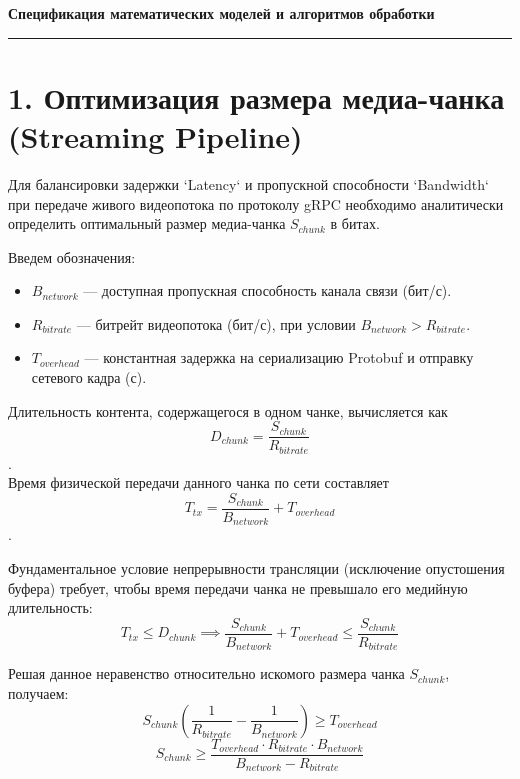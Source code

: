 \documentclass[12pt,a4paper]{article}
\begin{document}
\thispagestyle{fancy}

\begin{center}
    \vspace{0.4cm}
    \Large{\textbf{Спецификация математических моделей и алгоритмов обработки}}\\
        \vspace{0.5cm}
    \rule{\textwidth}{0.4pt}
\end{center}

\vspace{1cm}

\section{1. Оптимизация размера медиа-чанка (Streaming Pipeline)}

Для балансировки задержки `Latency` и пропускной способности `Bandwidth` при передаче живого видеопотока по протоколу gRPC необходимо аналитически определить оптимальный размер медиа-чанка $S_{chunk}$ в битах.

Введем обозначения:
\begin{itemize}
    \item $B_{network}$ --- доступная пропускная способность канала связи (бит/с).
    \item $R_{bitrate}$ --- битрейт видеопотока (бит/с), при условии $B_{network} > R_{bitrate}$.
    \item $T_{overhead}$ --- константная задержка на сериализацию Protobuf и отправку сетевого кадра (с).
\end{itemize}

Длительность контента, содержащегося в одном чанке, вычисляется как $$D_{chunk} = \frac{S_{chunk}}{R_{bitrate}}$$.\\
Время физической передачи данного чанка по сети составляет $$T_{tx} = \frac{S_{chunk}}{B_{network}} + T_{overhead}$$.

Фундаментальное условие непрерывности трансляции (исключение опустошения буфера) требует, чтобы время передачи чанка не превышало его медийную длительность:
\begin{equation}
T_{tx} \le D_{chunk} \implies \frac{S_{chunk}}{B_{network}} + T_{overhead} \le \frac{S_{chunk}}{R_{bitrate}}
\end{equation}

Решая данное неравенство относительно искомого размера чанка $S_{chunk}$, получаем:
\begin{equation}
S_{chunk} \left( \frac{1}{R_{bitrate}} - \frac{1}{B_{network}} \right) \ge T_{overhead}
\end{equation}
\begin{equation}
S_{chunk} \ge \frac{T_{overhead} \cdot R_{bitrate} \cdot B_{network}}{B_{network} - R_{bitrate}}
\end{equation}
\end{document}
